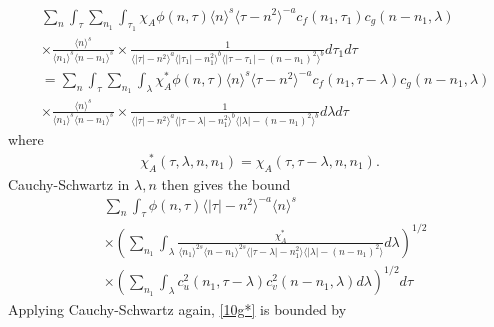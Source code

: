 \documentclass[12pt,reqno]{amsart}
\numberwithin{equation}{section}  %
\begin{document}
\begin{equation*}
	\begin{split}
    & \sum_{n} \int_{\tau}   \sum_{n_{1}}
    \int_{\tau_{1}} \chi_{A}
    \phi(n, \tau) \langle n \rangle^s \langle \tau - n^{2} \rangle^{-a}
  c_f(n_1, \tau_1)
		c_g(n - n_1, \lambda )
		\\
    & \times \frac{\langle n \rangle ^{s}}{\langle n_{1} \rangle ^{s} \langle
    n-n_{1} \rangle ^{s}} \times \frac{1}{\langle |\tau| - n^{2} \rangle
    ^{a}\langle |\tau_{1}|-n_{1}^{2} \rangle ^{b}\langle | \tau -
    \tau_{1}|-(n - n_{1})^{2}
    \rangle ^{b}} d \tau_1 d \tau
    \\
    & = \sum_{n} \int_{\tau}   \sum_{n_{1}}
    \int_{\lambda} \chi^{*}_{A}
    \phi(n, \tau) \langle n \rangle^s \langle \tau - n^{2} \rangle^{-a}
  c_f(n_1, \tau - \lambda)
		c_g(n - n_1, \lambda )
		\\
    & \times \frac{\langle n \rangle ^{s}}{\langle n_{1} \rangle ^{s} \langle
    n-n_{1} \rangle ^{s}} \times \frac{1}{\langle |\tau| - n^{2} \rangle
    ^{a}\langle |\tau - \lambda|-n_{1}^{2} \rangle ^{b}\langle |
    \lambda|-(n - n_{1})^{2}
    \rangle ^{b}} d \lambda  d \tau
	\end{split}
\end{equation*}
where 
%
%
\begin{equation}
  \label{change-of-var}
\begin{split}
  \chi^{*}_{A}(\tau, \lambda, n, n_{1}) =
  \chi_{A}(\tau, \tau - \lambda, n, n_{1}).
\end{split}
\end{equation}
%
%
Cauchy-Schwartz in
$\lambda, n$ then gives the bound
%
%
%
\begin{equation}
	\label{10g*}
	\begin{split}
    & \sum_{n} \int_{\tau} \phi(n, \tau) \langle | \tau | - n^{2} \rangle
    ^{-a} \langle n \rangle ^{s}
    \\
    & \times \left( \sum_{n_{1}} \int_{\lambda}
    \frac{\chi^{*}_{A}}{\langle n_{1} \rangle ^{2s} \langle n-n_{1} \rangle ^{2s} \langle |
    \tau - \lambda | - n_{1}^{2}\rangle  \langle | \lambda | -
    (n - n_{1})^{2} \rangle } d \lambda \right)^{1/2}
    \\
    & \times \left( \sum_{n_{1}} \int_{\lambda} c_{u}^{2}(n_{1}, \tau - \lambda)
    c_{v}^{2}(n - n_{1}, \lambda) d \lambda \right)^{1/2} d \tau
  \end{split}
\end{equation}
%
%
Applying Cauchy-Schwartz again, \eqref{10g*} is bounded by
\end{document}

